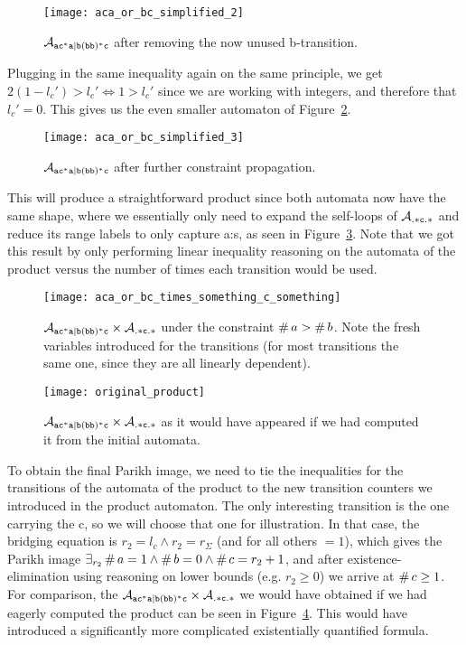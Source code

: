 \documentclass[acmsmall,review,anonymous,screen]{acmart}\settopmatter{printfolios=true,printccs=false,printacmref=true}
\theoremstyle{definition}
\begin{document}
\begin{figure}[ht]
  \centering 
    \texttt{[image: aca\_or\_bc\_simplified\_2]}
    \caption{$\mathcal{A}_{\mathtt{ac^*a|b(bb)^*c}}{}$ after removing the now unused b-transition.}\label{fig:example-simplify-2}
  \end{figure}

  Plugging in the same inequality again on the same principle, we get $2(1 -
  l_c') > l_c' \iff 1 > l_c'$ since we are working with integers, and
  therefore that $l_c' = 0$. This gives us the even smaller automaton of
  Figure~\ref{fig:example-simplify-3}.

  \begin{figure}[ht]
    \centering 
      \texttt{[image: aca\_or\_bc\_simplified\_3]}
      \caption{$\mathcal{A}_{\mathtt{ac^*a|b(bb)^*c}}{}$ after further constraint propagation.}\label{fig:example-simplify-3}
    \end{figure}

This will produce a straightforward product since both automata now have the
same shape, where we essentially only need to expand the self-loops of
$\mathcal{A}_{\mathtt{.*c.*}}$ and reduce its range labels to only capture a:s, as seen
in Figure~\ref{fig:final-example}. Note that we got this result by only
performing linear inequality reasoning on the automata of the product versus the
number of times each transition would be used.

\begin{figure}[ht]
\centering
    \texttt{[image: aca\_or\_bc\_times\_something\_c\_something]}
    \caption{$\mathcal{A}_{\mathtt{ac^*a|b(bb)^*c}}{} \times \mathcal{A}_{\mathtt{.*c.*}}{}$ under the constraint
    $\operatorname{\#}{a} > \operatorname{\#}{b}$. Note the fresh variables
    introduced for the transitions (for most transitions the same one, since
    they are all linearly dependent).}\label{fig:final-example}
  \end{figure}


  \begin{figure}[ht]
\centering
    \texttt{[image: original\_product]}
    \caption{$\mathcal{A}_{\mathtt{ac^*a|b(bb)^*c}}{} \times \mathcal{A}_{\mathtt{.*c.*}}{}$ as it would have
    appeared if we had computed it from the initial
    automata.}\label{fig:original-product}
  \end{figure}


To obtain the final Parikh image, we need to tie the inequalities for the
transitions of the automata of the product to the new transition counters we
introduced in the product automaton. The only interesting transition is the one
carrying the c, so we will choose that one for illustration. In that case, the
bridging equation is $r_2 = l_c \land r_2 = r_{\Sigma}$ (and for all others
$=1$), which gives the Parikh image $\exists_{r_2} \operatorname{\#}{a} = 1 \land
\operatorname{\#}{b} = 0 \land \operatorname{\#}{c} = r_2 + 1$, and after
existence-elimination using reasoning on lower bounds (e.g. $r_2 \geq 0$) we
arrive at $\operatorname{\#}{c} \geq 1$. For comparison, the $\mathcal{A}_{\mathtt{ac^*a|b(bb)^*c}}{} \times
\mathcal{A}_{\mathtt{.*c.*}}{}$ we would have obtained if we had eagerly computed the
product can be seen in Figure~\ref{fig:original-product}. This would have
introduced a significantly more complicated existentially quantified formula.
\end{document}
